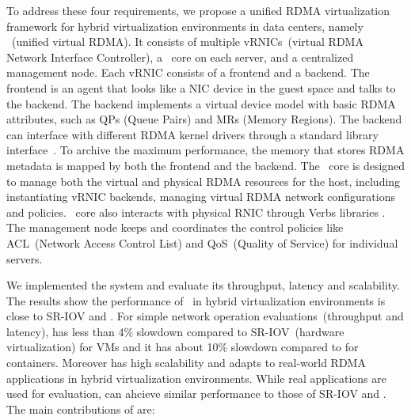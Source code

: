 To address these four requirements, we propose a unified RDMA virtualization framework for hybrid virtualization environments in data centers, namely \sys~(unified virtual RDMA). It consists of multiple vRNICs~(virtual RDMA Network Interface Controller), a \sys~core on each server, and a centralized management node.
Each vRNIC consists of a frontend and a backend. The frontend is an agent that looks like a NIC device in the guest space and talks to the backend. The backend implements a virtual device model with basic RDMA attributes, such as QPs (Queue Pairs) and MRs (Memory Regions). The backend can interface with different RDMA kernel drivers through a standard library interface~\cite{verbs}. To archive the maximum performance, the memory that stores RDMA metadata is mapped by both the frontend and the backend. 
The \sys~core is designed to manage both the virtual and physical RDMA resources for the host, including instantiating vRNIC backends, managing virtual RDMA network configurations and policies. \sys~core also interacts with physical RNIC through Verbs libraries \cite{verbs}.
The management node keeps and coordinates the control policies like ACL~(Network Access Control List) and QoS~(Quality of Service) for individual servers.

We implemented the \sys system and evaluate its throughput, latency and scalability. The results show the performance of \sys~in hybrid virtualization environments is close to SR-IOV and \native. For simple network operation evaluations~(throughput and latency), \sys has less than 4\% slowdown compared to SR-IOV~(hardware virtualization) for VMs and it has about 10\% slowdown compared to \native for containers. Moreover \sys has high scalability and adapts to real-world RDMA applications in hybrid virtualization environments. While real applications are used for evaluation, \sys can ahcieve similar performance to those of SR-IOV and \native. The main contributions of \sys are:

